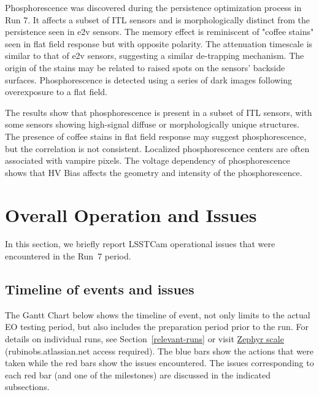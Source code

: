 Phosphorescence was discovered during the persistence optimization process in Run 7. It affects a subset of ITL sensors and is morphologically distinct from the persistence seen in e2v sensors. The memory effect is reminiscent of "coffee stains" seen in flat field response but with opposite polarity. The attenuation timescale is similar to that of e2v sensors, suggesting a similar de-trapping mechanism. The origin of the stains may be related to raised spots on the sensors' backside surfaces. Phosphorescence is detected using a series of dark images following overexposure to a flat field.

The results show that phosphorescence is present in a subset of ITL sensors, with some sensors showing high-signal diffuse or morphologically unique structures. The presence of coffee stains in flat field response may suggest phosphorescence, but the correlation is not consistent. Localized phosphorescence centers are often associated with vampire pixels. The voltage dependency of phosphorescence shows that HV Bias affects the geometry and intensity of the phosphorescence.

\clearpage

\section{Overall Operation and Issues}\label{sec:issues}
In this section, we briefly report LSSTCam operational issues that were encountered in the Run~7 period.

\subsection{Timeline of events and issues}\label{ganttchart}

The Gantt Chart below shows the timeline of event, not only limits to the actual EO testing period, but also includes the preparation period prior to the run. For details on individual runs, see Section~\ref{relevant-runs} or visit \href{https://rubinobs.atlassian.net/projects/BLOCK?selectedItem=com.atlassian.plugins.atlassian-connect-plugin:com.kanoah.test-manager__main-project-page#!/reports/testresults/list/view?tql=testResult.projectId%20IN%20(10064)%20AND%20testPlan.key%20IN%20(%22BLOCK-P15%22)%20AND%20testPlan.onlyLastTestResult%20IS%20true&epicJQL=&title=Test%20execution%20results%20(list)&projectId=10064&traceabilityReportOption=COVERAGE_TEST_CASES&traceabilityTreeOption=COVERAGE_TEST_CASES&traceabilityCustomTreeDisplayOption=CONDENSED&traceabilityMatrixOption=COVERAGE_TEST_CASES&scorecardOption=EXECUTION_RESULTS&displayUnit=COUNT&period=MONTH}{Zephyr scale} (rubinobs.atlassian.net access required).
The blue bars show the actions that were taken while the red bars show the issues encountered. The issues corresponding to each red bar (and one of the milestones) are discussed in the indicated subsections.

